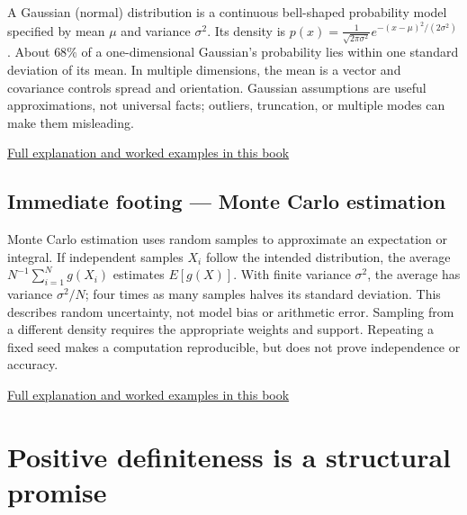\hypertarget{01-foundations-i-ch020-immediate-footing-gaussian-distribution}{}

A Gaussian (normal) distribution is a continuous bell-shaped probability model specified by mean \(\mu\) and variance \(\sigma^2\). Its density is \(p(x)=\frac{1}{\sqrt{2\pi\sigma^2}}e^{-(x-\mu)^2/(2\sigma^2)}\). About \(68\%\) of a one-dimensional Gaussian's probability lies within one standard deviation of its mean. In multiple dimensions, the mean is a vector and covariance controls spread and orientation. Gaussian assumptions are useful approximations, not universal facts; outliers, truncation, or multiple modes can make them misleading.

\hyperref[02-foundations-ii-ch023-discrete-and-continuous-distribution-families]{Full explanation and worked examples in this book}

\subsection{Immediate footing --- Monte Carlo estimation}\label{01-foundations-i-ch020-immediate-footing-monte-carlo-estimation}

\hypertarget{01-foundations-i-ch020-immediate-footing-monte-carlo-estimation}{}

Monte Carlo estimation uses random samples to approximate an expectation or integral. If independent samples \(X_i\) follow the intended distribution, the average \(N^{-1}\sum_{i=1}^N g(X_i)\) estimates \(E[g(X)]\). With finite variance \(\sigma^2\), the average has variance \(\sigma^2/N\); four times as many samples halves its standard deviation. This describes random uncertainty, not model bias or arithmetic error. Sampling from a different density requires the appropriate weights and support. Repeating a fixed seed makes a computation reproducible, but does not prove independence or accuracy.

\hyperref[02-foundations-ii-ch030-monte-carlo-estimates-trade-computation-for-uncertainty]{Full explanation and worked examples in this book}

\section{Positive definiteness is a structural promise}\label{01-foundations-i-ch020-positive-definiteness-is-a-structural-promise}

\hypertarget{01-foundations-i-ch020-positive-definiteness-is-a-structural-promise}{}

